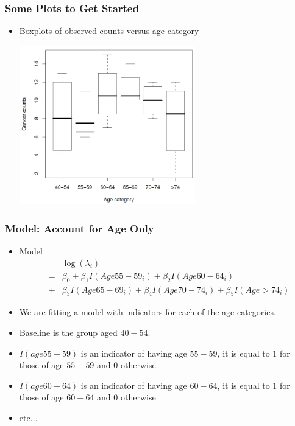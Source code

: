\documentclass[10pt,xcolor={svgnames},t]{beamer}
\begin{document}
%
%
\begin{frame}
	\frametitle{Some Plots to Get Started}
	
	\begin{itemize}
		\item Boxplots of observed counts versus age category
		\begin{center}
			\includegraphics[width=0.6\textwidth]{boxplot.jpg}
		\end{center}
	\end{itemize}
	
	
\end{frame}
%
%
%
\begin{frame}
	\frametitle{Model: Account for Age Only}
	
	\begin{itemize}
		\item Model
		\begin{eqnarray*}
			&&\log(\lambda_i )\\
			&=& \beta_0 +\beta_1 I(Age55-59_i)+\beta_2 I(Age60-64_i) \\
			&+&\beta_3 I(Age65-69_i)+\beta_4 I(Age70-74_i)+\beta_5 I(Age>74_i)
		\end{eqnarray*} 
		
		\item We are fitting a model with indicators for each of the age categories.
				\bigskip
		\item Baseline is the group aged $40-54$.
				\bigskip
		\item $I(age55-59)$ is an indicator of having age $55-59$, it is equal to $1$ for those of age $55-59$ and $0$ otherwise.
				\bigskip
		\item $I(age60-64)$ is an indicator of having age $60-64$, it is equal to $1$ for those of age $60-64$ and $0$ otherwise.
		\item etc...
	\end{itemize}
	
	
\end{frame}
\end{document}
